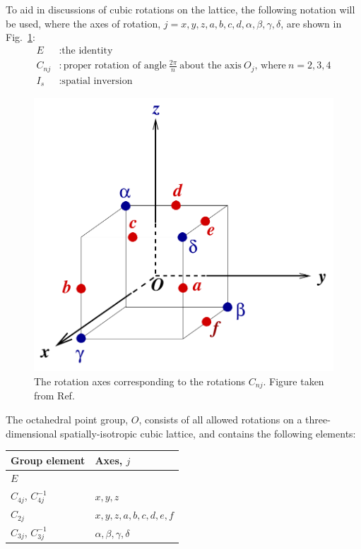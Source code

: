     To aid in discussions of cubic rotations on the lattice, the following notation will be used, where the axes of rotation, $j = x,y,z,a,b,c,d,\alpha,\beta,\gamma,\delta$, are shown in Fig.~\ref{fig:rotation_axes}:
    \begin{equation}
        \begin{aligned}
            E &: \text{the identity}\\
            C_{nj} &: \text{proper rotation of angle}\ \frac{2\pi}{n}\ \text{about the axis}\ O_j\text{, where}\ n = 2,3,4 \\
            I_s &: \text{spatial inversion}
        \end{aligned}
    \end{equation}
    \begin{figure}
        \centering
        \includegraphics[scale=0.5]{figures/Oaxes.pdf}
        \caption{The rotation axes corresponding to the rotations $C_{nj}$. Figure taken from Ref.~\cite{}}
        \label{fig:rotation_axes}
    \end{figure}
    The octahedral point group, $O$, consists of all allowed rotations on a three-dimensional spatially-isotropic cubic lattice, and contains the following elements:
    \begin{table}[h!]
        \centering
        \begin{tabular}{l|l}
            Group element & Axes, $j$\\
            \hline
            $E$ & \\
            $C_{4j}$, $C_{4j}^{-1}$ & $x,y,z$ \\
            $C_{2j}$ & $x,y,z,a,b,c,d,e,f$ \\
            $C_{3j}$, $C_{3j}^{-1}$ & $\alpha,\beta,\gamma,\delta$
        \end{tabular}
        \label{table:O}
    \end{table}

